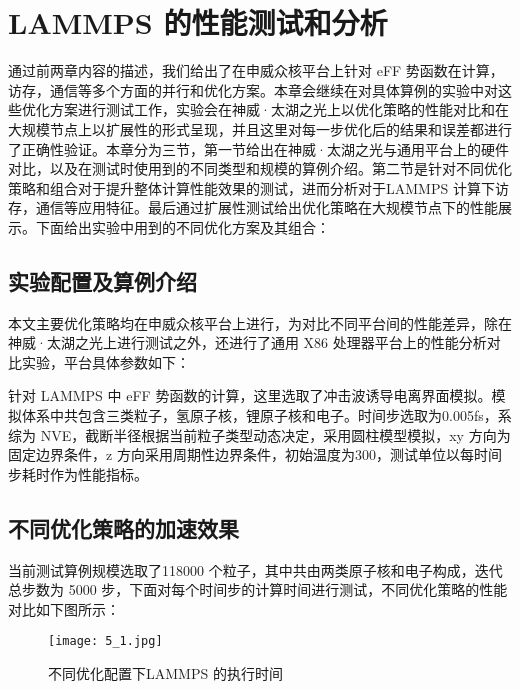 
\chapter{LAMMPS 的性能测试和分析}
通过前两章内容的描述，我们给出了在申威众核平台上针对 eFF 势函数在计算，访存，通信等多个方面的并行和优化方案。本章会继续在对具体算例的实验中对这些优化方案进行测试工作，实验会在神威·太湖之光上以优化策略的性能对比和在大规模节点上以扩展性的形式呈现，并且这里对每一步优化后的结果和误差都进行了正确性验证。本章分为三节，第一节给出在神威·太湖之光与通用平台上的硬件对比，以及在测试时使用到的不同类型和规模的算例介绍。第二节是针对不同优化策略和组合对于提升整体计算性能效果的测试，进而分析对于LAMMPS 计算下访存，通信等应用特征。最后通过扩展性测试给出优化策略在大规模节点下的性能展示。下面给出实验中用到的不同优化方案及其组合：

\section{实验配置及算例介绍}
本文主要优化策略均在申威众核平台上进行，为对比不同平台间的性能差异，除在神威·太湖之光上进行测试之外，还进行了通用 X86 处理器平台上的性能分析对比实验，平台具体参数如下：

针对 LAMMPS 中 eFF 势函数的计算，这里选取了冲击波诱导电离界面模拟。模拟体系中共包含三类粒子，氢原子核，锂原子核和电子。时间步选取为0.005fs，系综为 NVE，截断半径根据当前粒子类型动态决定，采用圆柱模型模拟，xy 方向为固定边界条件，z 方向采用周期性边界条件，初始温度为300，测试单位以每时间步耗时作为性能指标。

\section{不同优化策略的加速效果}
当前测试算例规模选取了118000 个粒子，其中共由两类原子核和电子构成，迭代总步数为 5000 步，下面对每个时间步的计算时间进行测试，不同优化策略的性能对比如下图所示：

 \begin{figure}[h]
  \centering
  \texttt{[image: 5\_1.jpg]}
  \caption{不同优化配置下LAMMPS 的执行时间}
  \label{fig:badge}
\end{figure}

